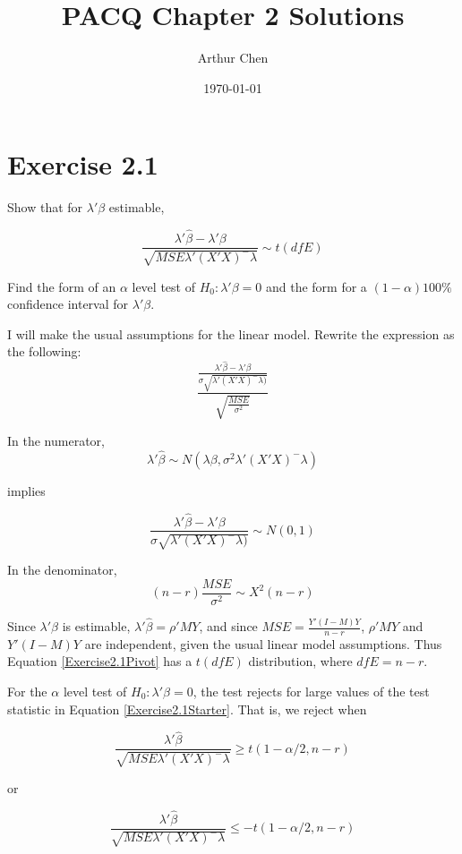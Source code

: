 \documentclass{article}
\author{Arthur Chen}
\title{PACQ Chapter 2 Solutions}
\date{\today}
\begin{document}
\maketitle

\section*{Exercise 2.1}

Show that for $\lambda'\beta$ estimable,

\begin{equation}
\label{Exercise2.1Starter}
\frac{\lambda'\hat{\beta} - \lambda'\beta}{
\sqrt{MSE\lambda'(X'X)^-\lambda}
} \sim t(dfE)
\end{equation}

Find the form of an $\alpha$ level test of $H_0: \lambda' \beta = 0$ and the form for a $(1-\alpha)100\%$ confidence interval for $\lambda'\beta$.

I will make the usual assumptions for the linear model. Rewrite the expression as the following:
\begin{equation}
\label{Exercise2.1Pivot}
\frac{
\frac{\lambda'\hat{\beta} - \lambda'\beta}{
\sigma \sqrt{\lambda'(X'X)^-\lambda)}
}
}{
\sqrt{\frac{MSE}{\sigma^2}}
}
\end{equation}

In the numerator,
\[
\lambda'\hat{\beta} \sim N(\lambda\beta, \sigma^2\lambda'(X'X)^-\lambda)
\]

implies

\[
\frac{\lambda'\hat{\beta} - \lambda'\beta}{
\sigma \sqrt{\lambda'(X'X)^-\lambda)}} \sim N(0, 1)
\]

In the denominator,
\[
(n-r)\frac{MSE}{\sigma^2} \sim X^2(n-r)
\]

Since $\lambda' \beta$ is estimable, $\lambda' \hat{\beta} = \rho'MY$, and since $MSE = \frac{Y'(I-M)Y}{n-r}$, $\rho'MY$ and $Y'(I-M)Y$ are independent, given the usual linear model assumptions. Thus Equation \ref{Exercise2.1Pivot} has a $t(dfE)$ distribution, where $dfE = n-r$.

For the $\alpha$ level test of $H_0: \lambda'\beta = 0$, the test rejects for large values of the test statistic in Equation \ref{Exercise2.1Starter}. That is, we reject when

\[
\frac{\lambda'\hat{\beta}}{
\sqrt{MSE\lambda'(X'X)^-\lambda}
} \geq t(1-\alpha/2, n-r)
\]

or

\[
\frac{\lambda'\hat{\beta}}{
\sqrt{MSE\lambda'(X'X)^-\lambda}
} \leq -t(1-\alpha/2, n-r)
\]
\end{document}
